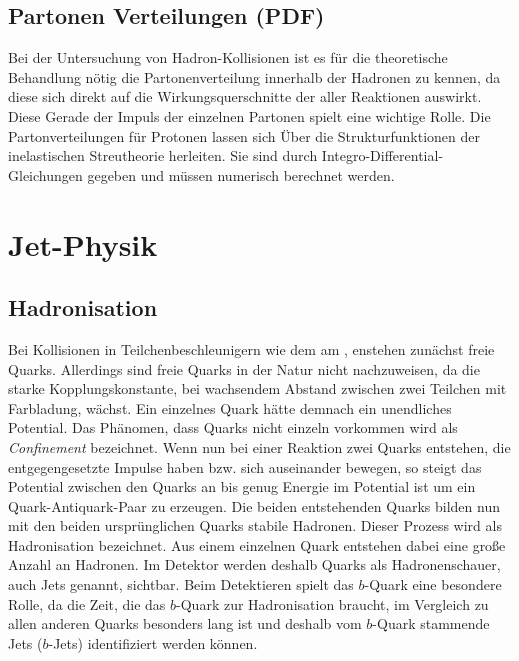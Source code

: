 \subsection{Partonen Verteilungen (PDF)}
Bei der Untersuchung von Hadron-Kollisionen ist es für die theoretische Behandlung nötig die Partonenverteilung innerhalb der Hadronen zu kennen, da diese sich direkt auf die Wirkungsquerschnitte der aller Reaktionen auswirkt. Diese Gerade der Impuls der einzelnen Partonen spielt eine wichtige Rolle. Die Partonverteilungen für Protonen lassen sich Über die Strukturfunktionen der inelastischen Streutheorie herleiten\cite{halzen2008quark}. Sie sind durch Integro-Differential-Gleichungen gegeben und müssen numerisch berechnet werden. 


\section{Jet-Physik}
\subsection{Hadronisation}
Bei Kollisionen in Teilchenbeschleunigern wie dem \lhc am \cern, enstehen zunächst freie Quarks. Allerdings sind freie Quarks in der Natur nicht nachzuweisen, da die starke Kopplungskonstante, bei wachsendem Abstand zwischen zwei Teilchen mit Farbladung, wächst. Ein einzelnes Quark hätte demnach ein unendliches Potential. Das Phänomen, dass Quarks nicht einzeln vorkommen wird als \emph{Confinement} bezeichnet. Wenn nun bei einer Reaktion zwei Quarks entstehen, die entgegengesetzte Impulse haben bzw. sich auseinander bewegen, so steigt das Potential zwischen den Quarks an bis genug Energie im Potential ist um ein Quark-Antiquark-Paar zu erzeugen\cite{Artru1983147}. Die beiden entstehenden Quarks bilden nun mit den beiden ursprünglichen Quarks stabile Hadronen. Dieser Prozess wird als Hadronisation bezeichnet. Aus einem einzelnen Quark entstehen dabei eine große Anzahl an Hadronen. Im Detektor werden deshalb Quarks als Hadronenschauer, auch Jets genannt, sichtbar. Beim Detektieren spielt das $b$-Quark eine besondere Rolle, da die Zeit, die das $b$-Quark zur Hadronisation braucht, im Vergleich zu allen anderen Quarks besonders lang ist und deshalb vom $b$-Quark stammende Jets ($b$-Jets) identifiziert werden können.
